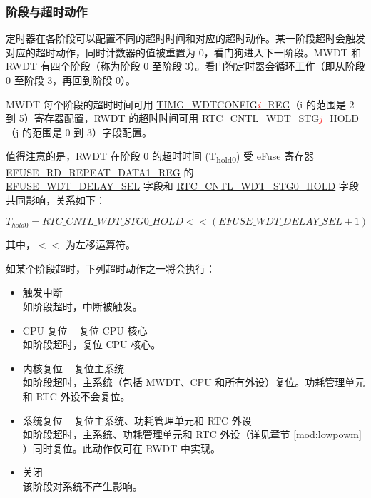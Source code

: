 \documentclass[main\_\_CN.tex]{subfiles}
\begin{document}
\subsubsection{阶段与超时动作}\label{sec:wdt-timeout}
定时器在各阶段可以配置不同的超时时间和对应的超时动作。某一阶段超时会触发对应的超时动作，同时计数器的值被重置为 0，看门狗进入下一阶段。MWDT 和 RWDT 有四个阶段（称为阶段 0 至阶段 3）。看门狗定时器会循环工作（即从阶段 0 至阶段 3，再回到阶段 0）。

MWDT 每个阶段的超时时间可用 \hyperref[regdesc:TIMGWDTCONFIG2REG]{TIMG\_WDTCONFIG\textcolor{red}{\it{i}}\_REG}（i 的范围是 2 到 5）寄存器配置，RWDT 的超时时间可用 \hyperref[fielddesc:RTCCNTLWDTSTG3]{RTC\_CNTL\_WDT\_STG\textcolor{red}{\it{j}}\_HOLD}（j 的范围是 0 到 3）字段配置。

值得注意的是，RWDT 在阶段 0 的超时时间 (T\textsubscript{hold0}) 受 eFuse 寄存器 \hyperref[regdesc:EFUSERDREPEATDATA1REG]{EFUSE\_RD\_REPEAT\_DATA1\_REG} 的 \\\hyperref[fielddesc:EFUSEWDTDELAYSEL]{EFUSE\_WDT\_DELAY\_SEL} 字段和 \hyperref[fielddesc:RTCCNTLWDTSTG0HOLD]{RTC\_CNTL\_WDT\_STG0\_HOLD} 字段共同影响，关系如下：

\begin{displaymath}
T_{hold0} = \hyperref[fielddesc:RTCCNTLWDTSTG0HOLD]{RTC\_CNTL\_WDT\_STG0\_HOLD}   << (\hyperref[fielddesc:EFUSEWDTDELAYSEL]{EFUSE\_WDT\_DELAY\_SEL} + 1)
\end{displaymath}

其中，$<<$ 为左移运算符。

如某个阶段超时，下列超时动作之一将会执行：
\begin{itemize}
    \item 触发中断\\
    如阶段超时，中断被触发。
    \item CPU 复位 -- 复位 CPU 核心\\
    如阶段超时，复位 CPU 核心。
    \item 内核复位 -- 复位主系统\\
    如阶段超时，主系统（包括 MWDT、CPU 和所有外设）复位。功耗管理单元和 RTC 外设不会复位。
    \item 系统复位 -- 复位主系统、功耗管理单元和 RTC 外设\\
    如阶段超时，主系统、功耗管理单元和 RTC 外设（详见章节 \ref{mod:lowpowm} \textit{}）同时复位。此动作仅可在 RWDT 中实现。
    \item 关闭\\
    该阶段对系统不产生影响。
\end{itemize}
\end{document}

